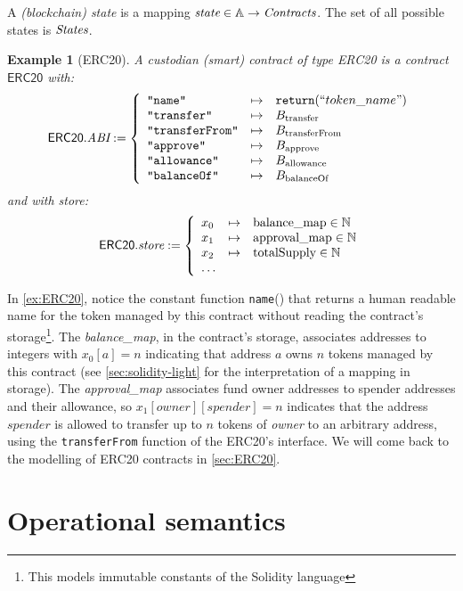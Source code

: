 \documentclass[12pt]{extarticle}
\newtheorem{example}{Example}
\begin{document}
A \emph{(blockchain) state} is a mapping $\textit{state}\in \mathbb{A}\to\textit{Contracts}$. The set of all possible states is $\textit{States}$.

\begin{example}[ERC20]\label{ex:ERC20}
A custodian (smart) contract of type ERC20 is a contract $\mathsf{ERC20}$ with:
$$
\mathsf{ERC20}.\textit{ABI} := \left\{
\begin{array}{lll}
\hbox{\rm\texttt{"name"}} & \mapsto & \mathtt{return}(``token\_name") \\
\hbox{\rm\texttt{"transfer"}} &\mapsto& B_{\textrm{transfer}}\\
\hbox{\rm\texttt{"transferFrom"}} &\mapsto& B_{\textrm{transferFrom}}\\
\hbox{\rm\texttt{"approve"}}&\mapsto& B_{\textrm{approve}} \\
\hbox{\rm\texttt{"allowance"}}&\mapsto& B_{\textrm{allowance}} \\
\hbox{\rm\texttt{"balanceOf"}}&\mapsto& B_{\textrm{balanceOf}}
\end{array}\right.
$$
and with store:
$$
\mathsf{ERC20}.\textit{store} := \left\{
\begin{array}{lll}
x_0 &\mapsto& \textrm{balance\_map}\in \mathbb{N} \\
x_1 &\mapsto& \textrm{approval\_map}\in \mathbb{N} \\
x_2 & \mapsto& \textrm{totalSupply}\in\mathbb{N} \\
\dots
\end{array}\right.
$$
\end{example}

In \autoref{ex:ERC20}, notice the constant function \texttt{name}() that returns a human readable name for the token managed by this contract without reading the contract's storage\footnote{This models immutable constants of the Solidity language}. The \textit{balance\_map}, in the contract's storage, associates addresses to integers with $x_0[a]=n$ indicating that address $a$ owns $n$ tokens managed by this contract (see \autoref{sec:solidity-light} for the interpretation of a mapping in storage). The \textit{approval\_map} associates fund owner addresses to spender addresses and their allowance, so $x_1[\mathit{owner}][\mathit{spender}]=n$ indicates that the address $\mathit{spender}$ is allowed to transfer up to $n$ tokens  of \textit{owner} to an arbitrary address, using the \texttt{transferFrom} function of the ERC20's interface. We will come back to the modelling of ERC20 contracts in \autoref{sec:ERC20}.

\section{Operational semantics}
\end{document}
